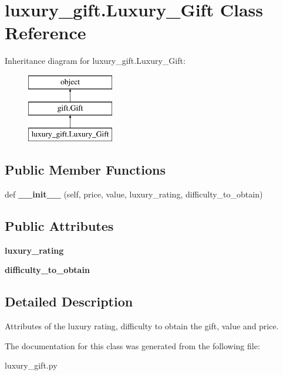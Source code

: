 \hypertarget{classluxury__gift_1_1_luxury___gift}{}\section{luxury\+\_\+gift.\+Luxury\+\_\+\+Gift Class Reference}
\label{classluxury__gift_1_1_luxury___gift}
Inheritance diagram for luxury\+\_\+gift.\+Luxury\+\_\+\+Gift\+:\begin{figure}[H]
\begin{center}
\leavevmode
\includegraphics[height=3.000000cm]{classluxury__gift_1_1_luxury___gift}
\end{center}
\end{figure}
\subsection*{Public Member Functions}
\begin{DoxyCompactItemize}
\item 
\mbox{\label{classluxury__gift_1_1_luxury___gift_ab93b10ec0683264d2c821a4963dd1dd2}} 
def {\bfseries \+\_\+\+\_\+init\+\_\+\+\_\+} (self, price, value, luxury\+\_\+rating, difficulty\+\_\+to\+\_\+obtain)
\end{DoxyCompactItemize}
\subsection*{Public Attributes}
\begin{DoxyCompactItemize}
\item 
\mbox{\label{classluxury__gift_1_1_luxury___gift_a6663d4dd880f62c54414f404de3c6643}} 
{\bfseries luxury\+\_\+rating}
\item 
\mbox{\label{classluxury__gift_1_1_luxury___gift_a585dc4d044e9bac12b7691aa8fd56076}} 
{\bfseries difficulty\+\_\+to\+\_\+obtain}
\end{DoxyCompactItemize}


\subsection{Detailed Description}
\begin{DoxyVerb}Attributes of the luxury rating, difficulty to obtain the gift, value and price.
\end{DoxyVerb}
 

The documentation for this class was generated from the following file\+:\begin{DoxyCompactItemize}
\item 
luxury\+\_\+gift.\+py\end{DoxyCompactItemize}
